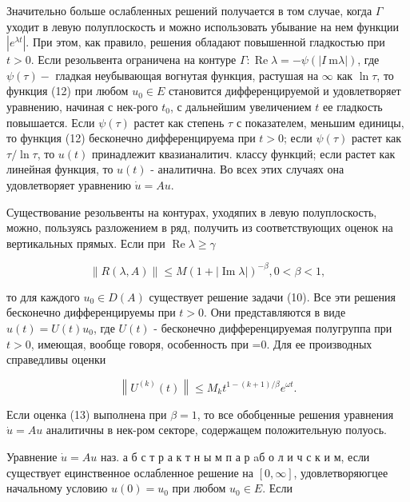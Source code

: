 \documentclass[10pt]{article}
\begin{document}
Значительно больше ослабленных решений получается в том случае, когда $\Gamma$ уходит в левую полуплоскость и можно использовать убывание на нем функции $\left|e^{\lambda t}\right|$. При этом, как правило, решения обладают повышенной гладкостью при $t>0$. Если резольвента ограничена на контуре $\Gamma: \operatorname{Re} \lambda=-\psi(|I \mathrm{~m} \lambda|)$, где $\psi(\tau)-$ гладкая неубывающая вогнутая функция, растушая на $\infty$ как $\ln \tau$, то функция (12) при любом $u_{0} \in E$ становится дифференцируемой и удовлетворяет уравнению, начиная с нек-рого $t_{0}$, с дальнейшим увеличением $t$ ее гладкость повышается. Если $\psi(\tau)$ растет как степень $\tau$ с показателем, меньшим единицы, то функция (12) бесконечно дифференцируема при $t>0$; если $\psi(\tau)$ растет как $\tau / \ln \tau$, то $u(t)$ принадлежит квазианалитич. классу функций; если растет как линейная функция, то $u(t)$ - аналитична. Во всех этих случаях она удовлетворяет уравнению $\dot{u}=A u$.



Существование резольвенты на контурах, уходяпих в левую полуплоскость, можно, пользуясь разложением в ряд, получить из соответствующих оценок на вертикальных прямых. Если при $\operatorname{Re} \lambda \geqslant \gamma$



\[

\|R(\lambda, A)\| \leqslant M(1+|\operatorname{Im} \lambda|)^{-\beta}, 0<\beta<1,

\]



то для каждого $u_{0} \in D(A)$ существует решение задачи (10). Все эти решения бесконечно дифференцируемы при $t>0$. Они представляются в виде $u(t)=U(t) u_{0}$, где $U(t)$ - бесконечно дифференцируемая полугруппа при $t>0$, имеющая, вообще говоря, особенность при =0. Для ее производных справедливы оценки



\[

\left\|U^{(k)}(t)\right\| \leqslant M_{k} t^{1-(k+1) / \beta} e^{\omega t} .

\]



Если оценка (13) выполнена при $\beta=1$, то все обобценные решения уравнения $\dot{u}=A u$ аналитичны в нек-ром секторе, содержащем положительную полуось.



Уравнение $\dot{u}=A u$ наз. а б с т р а к т н ы м п а р aб о л и ч с к и м, если существует ецинственное ослабленное решение на $[0, \infty]$, удовлетворяюгцее начальному условию $u(0)=u_{0}$ при любом $u_{0} \in E$. Если
\end{document}
